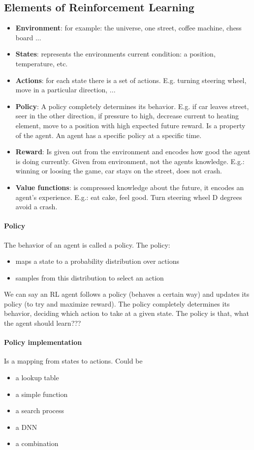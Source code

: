 \documentclass[10pt,a4paper]{article}
\begin{document}
\subsection{Elements of Reinforcement Learning}
\begin{itemize}
\item \textbf{Environment}: for example: the universe, one street, coffee machine, chess board ...
\item \textbf{States}: represents the environments current condition: a position, temperature, etc.
\item \textbf{Actions}: for each state there is a set of actions. E.g. turning steering wheel, move in a particular direction, ...
\item \textbf{Policy}: A policy completely determines its behavior. E.g. if car leaves street, seer in the other direction, if pressure to high, decrease current to heating element, move to a position with high expected future reward. Is a property of the agent. An agent has a specific policy at a specific time.
\item \textbf{Reward}: Is given out from the environment and encodes how good the agent is doing currently. Given from environment, not the agents knowledge. E.g.: winning or loosing the game, car stays on the street, does not crash. 
\item \textbf{Value functions}: is compressed knowledge about the future, it encodes an agent's experience. E.g.: eat cake, feel good. Turn steering wheel D degrees avoid a crash.
\end{itemize}

\paragraph{Policy}
The behavior of an agent is called a policy. The policy:
\begin{itemize}
\item maps a state to a probability distribution over actions
\item samples from this distribution to select an action
\end{itemize}
We can say an RL agent follows a policy (behaves a certain way) and updates its policy (to try and maximize reward).
The policy completely determines its behavior, deciding which action to take at a given state.
The policy is that, what the agent should learn???

\paragraph{Policy implementation} Is a mapping from states to actions. Could be
\begin{itemize}
\item a lookup table
\item a simple function
\item a search process
\item a DNN
\item a combination
\end{itemize}
\end{document}
